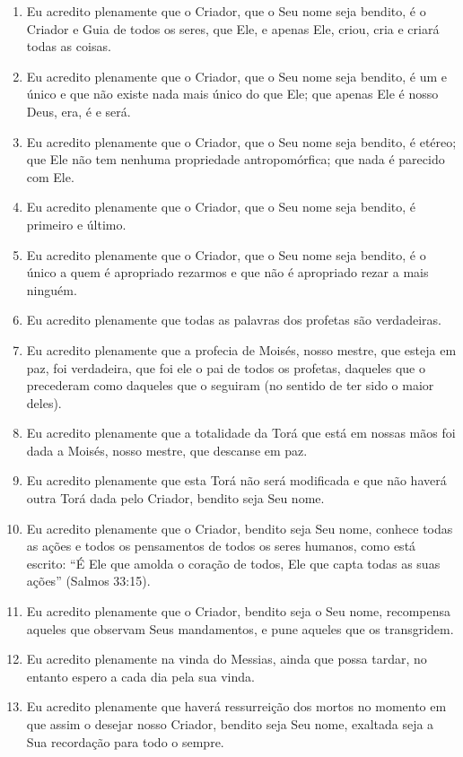 \begin{enumerate}
\def\labelenumi{\arabic{enumi}.}
\item
  Eu acredito plenamente que o Criador, que o Seu nome seja bendito, é o
  Criador e Guia de todos os seres, que Ele, e apenas Ele, criou, cria e
  criará todas as coisas.

\item
  Eu acredito plenamente que o Criador, que o Seu nome seja bendito, é
  um e único e que não existe nada mais único do que Ele; que apenas Ele
  é nosso Deus, era, é e será.

\item
  Eu acredito plenamente que o Criador, que o Seu nome seja bendito, é
  etéreo; que Ele não tem nenhuma propriedade antropomórfica; que nada
  é parecido com Ele.

\item
  Eu acredito plenamente que o Criador, que o Seu nome seja bendito, é
  primeiro e último.

\item
  Eu acredito plenamente que o Criador, que o Seu nome seja bendito, é o
  único a quem é apropriado rezarmos e que não é apropriado rezar a mais
  ninguém.

\item
  Eu acredito plenamente que todas as palavras dos profetas são
  verdadeiras.

\item
  Eu acredito plenamente que a profecia de Moisés, nosso mestre, que
  esteja em paz, foi verdadeira, que foi ele o pai de todos os profetas,
  daqueles que o precederam como daqueles que o seguiram (no sentido de
  ter sido o maior deles).

\item
  Eu acredito plenamente que a totalidade da Torá que está em
  nossas mãos foi dada a Moisés, nosso mestre, que descanse em paz.

\item
  Eu acredito plenamente que esta Torá não será modificada e que
  não haverá outra Torá dada pelo Criador, bendito seja Seu
  nome.

\item
  Eu acredito plenamente que o Criador, bendito seja Seu nome, conhece
  todas as ações e todos os pensamentos de todos os seres humanos, como
  está escrito: ``É Ele que amolda o coração de todos, Ele que capta
  todas as suas ações'' (Salmos 33:15).

\item
  Eu acredito plenamente que o Criador, bendito seja o Seu nome,
  recompensa aqueles que observam Seus mandamentos, e pune aqueles que
  os transgridem.

\item
  Eu acredito plenamente na vinda do Messias, ainda que possa tardar, no
  entanto espero a cada dia pela sua vinda.

\item
  Eu acredito plenamente que haverá ressurreição dos mortos no momento
  em que assim o desejar nosso Criador, bendito seja Seu nome, exaltada
  seja a Sua recordação para todo o sempre.
\end{enumerate}

